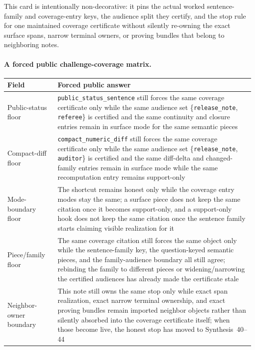\documentclass[11pt]{article}
\begin{document}
This card is intentionally non-decorative: it pins the actual worked sentence-family and coverage-entry keys, the audience split they certify, and the stop rule for one maintained coverage certificate without silently re-owning the exact surface spans, narrow terminal owners, or proving bundles that belong to neighboring notes.\cite{series:workedexample}

\paragraph{A forced public challenge-coverage matrix.}
\begin{table}[t]
\centering
\small
\begin{tabularx}{\linewidth}{@{}lX@{}}
\toprule
Field & Forced public answer \\
\midrule
Public-status floor & \nolinkurl{public_status_sentence} still forces the same coverage certificate only while the same audience set \{\nolinkurl{release_note}, \nolinkurl{referee}\} is certified and the same continuity and closure entries remain in \textsf{surface} mode for the same semantic pieces \\
Compact-diff floor & \nolinkurl{compact_numeric_diff} still forces the same coverage certificate only while the same audience set \{\nolinkurl{release_note}, \nolinkurl{auditor}\} is certified and the same diff-delta and changed-family entries remain in \textsf{surface} mode while the same recomputation entry remains \textsf{support-only} \\
Mode-boundary floor & The shortcut remains honest only while the coverage entry modes stay the same; a \textsf{surface} piece does not keep the same citation once it becomes support-only, and a support-only hook does not keep the same citation once the sentence family starts claiming visible realization for it \\
Piece/family floor & The same coverage citation still forces the same object only while the sentence-family key, the question-keyed semantic pieces, and the family-audience boundary all still agree; rebinding the family to different pieces or widening/narrowing the certified audiences has already made the certificate stale \\
Neighbor-owner boundary & This note still owns the same stop only while exact span realization, exact narrow terminal ownership, and exact proving bundles remain imported neighbor objects rather than silently absorbed into the coverage certificate itself; when those become live, the honest stop has moved to Synthesis~40--44 \\

\end{tabularx}
\end{table}
\end{document}
